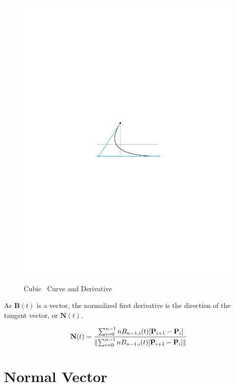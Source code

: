 \documentclass[oneside,usepdftitle=true]{article}
\providecommand{\norm}[1]{\lVert#1\rVert}
\begin{document}
\begin{figure}[htp]
\begin{center}
{		\includegraphics{figure_bezier_spline_deriv}
	}
	
	\caption{Cubic \Bezier\ Curve and Derivative}
\end{center}
\end{figure}

As $\mathbf{B}(t)$ is a vector, the normalized first derivative is the direction of the tangent vector, or $\mathbf{N}(t).$

\begin{equation}\label{eqn:bezier_tangent}
	\mathbf{N}(t) = \cfrac{\sum_{i=0}^{n-1} n B_{n-1,i}(t) [ \mathbf{P}_{i+1} - \mathbf{P}_i ]}{\norm{\sum_{i=0}^{n-1} n B_{n-1,i}(t) [ \mathbf{P}_{i+1} - \mathbf{P}_i ]}}
\end{equation}



\section{Normal Vector}
\end{document}

